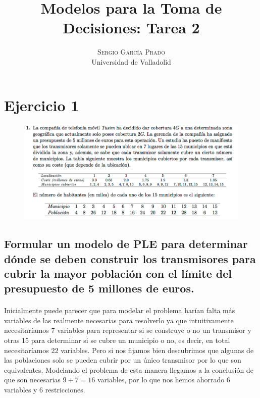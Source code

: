\documentclass[10pt, a4paper]{article}
\title{\vspace{-15mm}\fontsize{24pt}{10pt}\selectfont\textbf{Modelos para la Toma de Decisiones: Tarea 2}} %
\author{
\large
\textsc{Sergio García Prado}\\[2mm] %
\normalsize Universidad de Valladolid \\ %
\vspace{-5mm}
}
\date{}
\begin{document}
	\maketitle %

	\thispagestyle{fancy} %


    \section{Ejercicio 1}

        \begin{figure}[H]
        \centering
            \includegraphics[width=\textwidth]{res/exercise-1.png}
        \end{figure}


		\subsection{Formular un modelo de PLE para determinar dónde se deben construir los transmisores para cubrir la mayor población con el límite del presupuesto de 5 millones de euros.}

			\paragraph{}
			Inicialmente puede parecer que para modelar el problema harían falta más variables de las realmente necesarias para resolverlo ya que intuitivamente necesitaríamos 7 variables para representar si se construye o no un transmisor y otras 15 para determinar si se cubre un municipio o no, es decir, en total necesitaríamos 22 variables. Pero si nos fijamos bien descubrimos que algunas de las poblaciones solo se pueden cubrir por un único transmisor por lo que son equivalentes. Modelando el problema de esta manera llegamos a la conclusión de que son necesarias $9 + 7 = 16$ variables, por lo que nos hemos ahorrado 6 variables y 6 restricciones.
\end{document}
